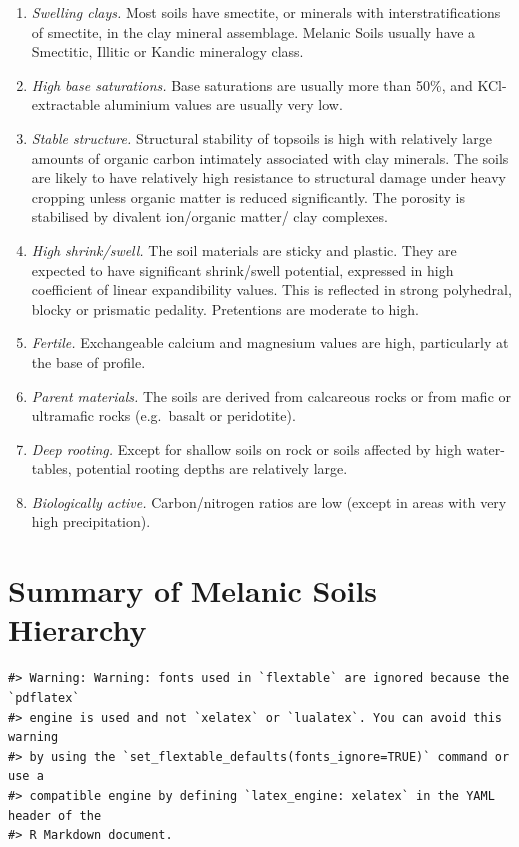\documentclass[
  letterpaper,
  DIV=11,
  numbers=noendperiod]{scrreprt}
\providecommand{\tightlist}{%
  \setlength{\itemsep}{0pt}\setlength{\parskip}{0pt}}\usepackage{longtable,booktabs,array}
\begin{document}
\begin{enumerate}
\def\labelenumi{\arabic{enumi}.}
\tightlist
\item
  \emph{Swelling clays.} Most soils have smectite, or minerals with
  interstratifications of smectite, in the clay mineral assemblage.
  Melanic Soils usually have a Smectitic, Illitic or Kandic mineralogy
  class.
\item
  \emph{High base saturations.} Base saturations are usually more than
  50\%, and KCl-extractable aluminium values are usually very low.
\item
  \emph{Stable structure.} Structural stability of topsoils is high with
  relatively large amounts of organic carbon intimately associated with
  clay minerals. The soils are likely to have relatively high resistance
  to structural damage under heavy cropping unless organic matter is
  reduced significantly. The porosity is stabilised by divalent
  ion/organic matter/ clay complexes.
\item
  \emph{High shrink/swell.} The soil materials are sticky and plastic.
  They are expected to have significant shrink/swell potential,
  expressed in high coefficient of linear expandibility values. This is
  reflected in strong polyhedral, blocky or prismatic pedality.
  Pretentions are moderate to high.
\item
  \emph{Fertile.} Exchangeable calcium and magnesium values are high,
  particularly at the base of profile.
\item
  \emph{Parent materials.} The soils are derived from calcareous rocks
  or from mafic or ultramafic rocks (e.g.~basalt or peridotite).
\item
  \emph{Deep rooting.} Except for shallow soils on rock or soils
  affected by high water-tables, potential rooting depths are relatively
  large.
\item
  \emph{Biologically active.} Carbon/nitrogen ratios are low (except in
  areas with very high precipitation).
\end{enumerate}

\hypertarget{sec-sum-E}{%
\section{Summary of Melanic Soils Hierarchy}\label{sec-sum-E}}

\begin{verbatim}
#> Warning: Warning: fonts used in `flextable` are ignored because the `pdflatex`
#> engine is used and not `xelatex` or `lualatex`. You can avoid this warning
#> by using the `set_flextable_defaults(fonts_ignore=TRUE)` command or use a
#> compatible engine by defining `latex_engine: xelatex` in the YAML header of the
#> R Markdown document.
\end{verbatim}
\end{document}
